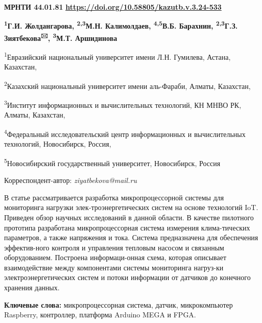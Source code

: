 \newpage
{\bfseries МРНТИ 44.01.81}
\hfill {\bfseries \href{https://doi.org/10.58805/kazutb.v.3.24-533}{https://doi.org/10.58805/kazutb.v.3.24-533}}


\begin{center}
{\bfseries \textsuperscript{1}Г.И. Жолдангарова, \textsuperscript{2,3}М.Н.
Калимолдаев, \textsuperscript{4,5}В.Б. Барахнин,
\textsuperscript{2,3}Г.З. Зиятбекова\textsuperscript{🖂}, \textsuperscript{3}М.Т. Аршидинова}

\textsuperscript{1}Евразийский национальный университет имени Л.Н.
Гумилева, Астана, Казахстан,

\textsuperscript{2}Казахский национальный университет имени аль-Фараби,
Алматы, Казахстан,

\textsuperscript{3}Институт информационных и вычислительных технологий,
КН МНВО РК, Алматы, Казахстан,

\textsuperscript{4}Федеральный исследовательский центр информационных и
вычислительных технологий, Новосибирск, Россия,

\textsuperscript{5}Новосибирский государственный университет,
Новосибирск, Россия
\end{center}
Корреспондент-автор: \emph{ziyatbekova@mail.ru} \vspace{0.5cm}

В статье рассматривается разработка микропроцессорной системы для
мониторинга нагрузки элек-троэнергетических систем на основе технологий
IoT. Приведен обзор научных исследований в данной области. В качестве
пилотного прототипа разработана микропроцессорная система измерения
клима-тических параметров, а также напряжения и тока. Система
предназначена для обеспечения эффектив-ного контроля и управления
тепловым насосом и связанным оборудованием. Построена информаци-онная
схема, которая описывает взаимодействие между компонентами системы
мониторинга нагруз-ки электроэнергетических систем и потоки информации от
датчиков до конечного хранения данных.

{\bfseries Ключевые слова:} микропроцессорная система, датчик,
микрокомпьютер Raspberry, контроллер, платформа Arduino MEGA и FPGA.



